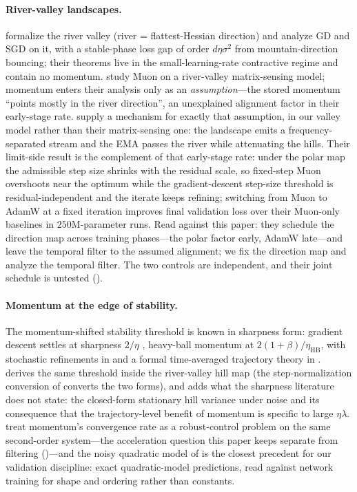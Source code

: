 \documentclass[11pt,a4paper]{article}
\theoremstyle{remark}
\begin{document}
\paragraph{River-valley landscapes.} \citet{wen2024river} formalize the river valley (river = flattest-Hessian direction) and analyze GD and SGD on it, with a stable-phase loss gap of order $d\eta\sigma^2$ from mountain-direction bouncing; their theorems live in the small-learning-rate contractive regime and contain no momentum.
\citet{shen2026muon} study Muon on a river-valley matrix-sensing model; momentum enters their analysis only as an \emph{assumption}---the stored momentum ``points mostly in the river direction'', an unexplained alignment factor in their early-stage rate.
 supply a mechanism for exactly that assumption, in our valley model rather than their matrix-sensing one: the landscape emits a frequency-separated stream and the EMA passes the river while attenuating the hills.
Their limit-side result is the complement of that early-stage rate: under the polar map the admissible step size shrinks with the residual scale, so fixed-step Muon overshoots near the optimum while the gradient-descent step-size threshold is residual-independent and the iterate keeps refining; switching from Muon to AdamW at a fixed iteration improves final validation loss over their Muon-only baselines in $250$M-parameter runs.
Read against this paper: they schedule the direction map across training phases---the polar factor early, AdamW late---and leave the temporal filter to the assumed alignment; we fix the direction map and analyze the temporal filter.
The two controls are independent, and their joint schedule is untested ().

\paragraph{Momentum at the edge of stability.} The momentum-shifted stability threshold is known in sharpness form: gradient descent settles at sharpness $2/\eta$ \citep{cohen2021edge}, heavy-ball momentum at $2(1+\beta)/\eta_{\mathrm{HB}}$, with stochastic refinements in \citet{andreyev2026momentum} and a formal time-averaged trajectory theory in \citet{cohen2025central}.
 derives the same threshold inside the river-valley hill map (the step-normalization conversion of  converts the two forms), and  adds what the sharpness literature does not state: the closed-form stationary hill variance under noise and its consequence that the trajectory-level benefit of momentum is specific to large $\eta\lambda$.
\citet{lessard2016analysis} treat momentum's convergence rate as a robust-control problem on the same second-order system---the acceleration question this paper keeps separate from filtering ()---and the noisy quadratic model of \citet{zhang2019noisy} is the closest precedent for our validation discipline: exact quadratic-model predictions, read against network training for shape and ordering rather than constants.
\end{document}
